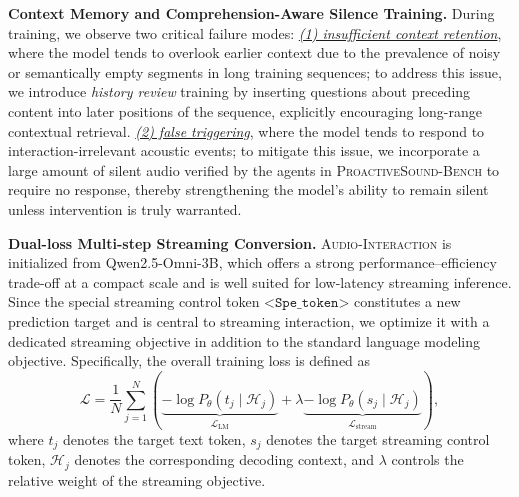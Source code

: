 \documentclass{article}
\begin{document}

\textbf{Context Memory and Comprehension-Aware Silence Training.}  During training, we observe two critical failure modes: \underline{\textit{(1) insufficient context retention}}, where the model tends to overlook earlier context due to the prevalence of noisy or semantically empty segments in long training sequences; to address this issue, we introduce \emph{history review} training by inserting questions about preceding content into later positions of the sequence, explicitly encouraging long-range contextual retrieval. \underline{\textit{(2) false triggering}}, where the model tends to respond to interaction-irrelevant acoustic events; to mitigate this issue, we incorporate a large amount of silent audio verified by the agents in \textsc{ProactiveSound-Bench} to require no response, thereby strengthening the model's ability to remain silent unless intervention is truly warranted.

\textbf{Dual-loss Multi-step Streaming Conversion.}  \textsc{Audio-Interaction} is initialized from Qwen2.5-Omni-3B, which offers a strong performance--efficiency trade-off at a compact scale and is well suited for low-latency streaming inference. Since the special streaming control token $\texttt{<Spe\_token>}$ constitutes a new prediction target and is central to streaming interaction, we optimize it with a dedicated streaming objective in addition to the standard language modeling objective. Specifically, the overall training loss is defined as
\[
\mathcal{L}
=
\frac{1}{N}\sum_{j=1}^{N}
\left(
\underbrace{-\log P_\theta\!\left(t_j \mid \mathcal{H}_j\right)}_{\mathcal{L}_{\mathrm{LM}}}
+
\lambda\underbrace{-\log P_\theta\!\left(s_j \mid \mathcal{H}_j\right)}_{\mathcal{L}_{\mathrm{stream}}}
\right),
\]
where $t_j$ denotes the target text token, $s_j$ denotes the target streaming control token, $\mathcal{H}_j$ denotes the corresponding decoding context, and $\lambda$ controls the relative weight of the streaming objective.
\end{document}
